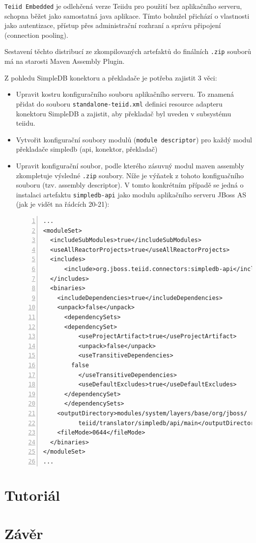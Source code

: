 \documentclass[oneside,12pt,final]{fithesis2}
\begin{document}
\texttt{Teiid Embedded} je odlehčená verze Teiidu pro použití bez aplikačního serveru, schopna běžet jako samostatná java aplikace. Tímto bohužel přichází o vlastnosti jako autentizace, přístup přes administrační rozhraní a správu připojení (connection pooling).

Sestavení těchto distribucí ze zkompilovaných artefaktů do finálních \texttt{.zip} souborů má na starosti Maven Assembly Plugin. 

Z pohledu SimpleDB konektoru a překladače je potřeba zajistit 3 věci:

\begin{itemize}
 \item Upravit kostru konfiguračního souboru aplikačního serveru. To znamená přidat do souboru \texttt{standalone-teiid.xml} definici resource adapteru konektoru SimpleDB a zajistit, aby překladač byl uveden v subsystému teiidu.
 \item Vytvořit konfigurační soubory modulů (\texttt{module descriptor}) pro každý modul překladače simpledb (api, konektor, překladač)
 \item Upravit konfigurační soubor, podle kterého zásuvný modul maven assembly zkompletuje výsledné \texttt{.zip} soubory. Níže je výňatek z tohoto konfiguačního souboru (tzv. assembly descriptor). V tomto konkrétním případě se jedná o instalaci artefaktu \texttt{simpledb-api} jako modulu aplikačního serveru JBoss AS (jak je vidět na řádcích 20-21):
 \begin{Verbatim}[fontsize=\small,numbers=left]
...
<moduleSet>
  <includeSubModules>true</includeSubModules>
  <useAllReactorProjects>true</useAllReactorProjects>
  <includes>
      <include>org.jboss.teiid.connectors:simpledb-api</include>
  </includes>
  <binaries>        
    <includeDependencies>true</includeDependencies>
    <unpack>false</unpack>
      <dependencySets>
	  <dependencySet>
	      <useProjectArtifact>true</useProjectArtifact>
	      <unpack>false</unpack>
	      <useTransitiveDependencies>
		false
	      </useTransitiveDependencies>
	      <useDefaultExcludes>true</useDefaultExcludes>
	  </dependencySet>
      </dependencySets>          
    <outputDirectory>modules/system/layers/base/org/jboss/
	      teiid/translator/simpledb/api/main</outputDirectory>
    <fileMode>0644</fileMode>
  </binaries>
</moduleSet>  
...
\end{Verbatim}
    
\end{itemize}



\chapter{Tutoriál}
\chapter{Závěr}
\end{document}
